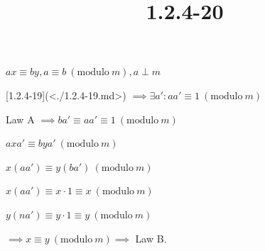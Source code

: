 \documentclass{article}
\title{1.2.4-20}
\begin{document}
\maketitle

$ax \equiv by, a \equiv b\ (\mathrm{modulo}\ m), a \perp m$

[1.2.4-19](<./1.2.4-19.md>) $\implies \exists a': aa' \equiv 1\ (\mathrm{modulo}\ m)$

Law A $\implies ba' \equiv aa' \equiv 1\ (\mathrm{modulo}\ m)$

$axa' \equiv bya'\ (\mathrm{modulo}\ m)$

$x(aa') \equiv y(ba')\ (\mathrm{modulo}\ m)$

$x(aa') \equiv x\cdot 1 \equiv x\ (\mathrm{modulo}\ m)$

$y(na') \equiv y\cdot 1 \equiv y\ (\mathrm{modulo}\ m)$

$\implies x \equiv y\ (\mathrm{modulo}\ m) \implies$ Law B.
\end{document}
